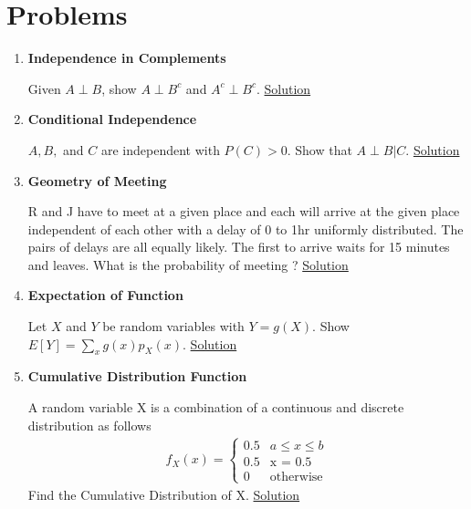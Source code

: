 \documentclass[../probability-notes.tex]{subfiles}
\begin{document}
    \section{Problems}
    \begin{enumerate}
    \item \hypertarget{q_indcomp}{\textbf{Independence in Complements}}\newline
    Given $A \perp B$, show $A \perp B^{c}$ and $A^{c} \perp B^{c}$. \hyperlink{a_indcomp}{Solution}

    \item \hypertarget{q_conind}{\textbf{Conditional Independence}}\newline
    $A,B,$ and $C$ are independent with $P(C) > 0$. Show that $A\perp B |C$. \hyperlink{a_conind}{Solution}

    \item \hypertarget{q_geomeet}{\textbf{Geometry of Meeting}}\newline
    R and J have to meet at a given place and each will arrive at the given place independent of each other with a delay of 0 to 1hr uniformly distributed. The pairs of delays are all equally likely. The first to arrive waits for 15 minutes and leaves. What is the probability of meeting ? \hyperlink{a_geomeet}{Solution}
    
    \item \hypertarget{q_expfn}{\textbf{Expectation of Function}}\newline
    Let $X$ and $Y$ be random variables with $Y = g(X)$. Show $E[Y] = \sum_{x}g(x)p_{X}(x)$. \hyperlink{a_expfn}{Solution}

    \item \hypertarget{q_cumuldistfn}{\textbf{Cumulative Distribution Function}}\newline
    A random variable X is a combination of a continuous and discrete distribution as follows
    \begin{align*}
        f_{X}(x) = \begin{cases} 0.5 &\mbox{$a \leq x \leq b$}\\
                                 0.5 &\mbox{x = 0.5}\\
                                 0 &\mbox{otherwise} \end{cases}
    \end{align*}
    Find the Cumulative Distribution of X. \hyperlink{a_cumuldistfn}{Solution}
    

\end{enumerate}
\end{document}
